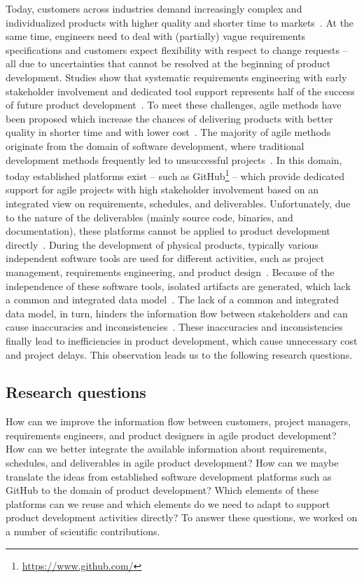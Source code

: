     Today, customers across industries demand increasingly complex and individualized products with higher quality and shorter time to markets~\cite{Ahti2005}.
    At the same time, engineers need to deal with (partially) vague requirements specifications and customers expect flexibility with respect to change requests -- all due to uncertainties that cannot be resolved at the beginning of product development.
    Studies show that systematic requirements engineering with early stakeholder involvement and dedicated tool support represents half of the success of future product development~\cite{6226784}.
    To meet these challenges, agile methods have been proposed which increase the chances of delivering products with better quality in shorter time and with lower cost~\cite{ozkan2019agile}. 
    The majority of agile methods originate from the domain of software development, where traditional development methods frequently led to unsuccessful projects~\cite{HEIMICKE2021786}.
    In this domain, today established platforms exist -- such as GitHub\footnote{\url{https://www.github.com/}} -- which provide dedicated support for agile projects with high stakeholder involvement based on an integrated view on requirements, schedules, and deliverables.
    Unfortunately, due to the nature of the deliverables (mainly source code, binaries, and documentation), these platforms cannot be applied to product development directly~\cite{HEIMICKE2021786}. 
    During the development of physical products, typically various independent software tools are used for different activities, such as project management, requirements engineering, and product design~\cite{MarionTucker}.
    Because of the independence of these software tools, isolated artifacts are generated, which lack a common and integrated data model~\cite{houshmand2010collaborative}.
    The lack of a common and integrated data model, in turn, hinders the information flow between stakeholders and can cause inaccuracies and inconsistencies~\cite{Jorma2014}.
    These inaccuracies and inconsistencies finally lead to inefficiencies in product development, which cause unnecessary cost and project delays.
    This observation leads us to the following research questions.
    
    \subsection*{Research questions}
    How can we improve the information flow between customers, project managers, requirements engineers, and product designers in agile product development?
    How can we better integrate the available information about requirements, schedules, and deliverables in agile product development?
    How can we maybe translate the ideas from established software development platforms such as GitHub to the domain of product development?
    Which elements of these platforms can we reuse and which elements do we need to adapt to support product development activities directly?
    To answer these questions, we worked on a number of scientific contributions.

